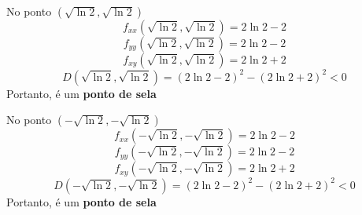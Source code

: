 \documentclass[a4paper,12pt,fleqn]{article}
\begin{document}
\begin{answer}
  \bigskip
  No ponto \(\left(\sqrt{\ln 2}, \sqrt{\ln 2}\right)\)
  \[
    f_{xx}\left(\sqrt{\ln 2}, \sqrt{\ln 2}\right)
    = 2\ln 2 -2
  \]
  \[
    f_{yy}\left(\sqrt{\ln 2}, \sqrt{\ln 2}\right)
    = 2\ln 2 -2
  \]
  \[
    f_{xy}\left(\sqrt{\ln 2}, \sqrt{\ln 2}\right)
    = 2\ln 2 +2
  \]
  \[
    D\left(\sqrt{\ln 2}, \sqrt{\ln 2}\right)
    = (2\ln 2 -2)^2 - (2\ln 2 +2)^2
    < 0
  \]
  Portanto, é um \textbf{ponto de sela}

  \bigskip
  No ponto \(\left(-\sqrt{\ln 2}, -\sqrt{\ln 2}\right)\)
  \[
    f_{xx}\left(-\sqrt{\ln 2}, -\sqrt{\ln 2}\right)
    = 2\ln 2 -2
  \]
  \[
    f_{yy}\left(-\sqrt{\ln 2}, -\sqrt{\ln 2}\right)
    = 2\ln 2 -2
  \]
  \[
    f_{xy}\left(-\sqrt{\ln 2}, -\sqrt{\ln 2}\right)
    = 2\ln 2 +2
  \]
  \[
    D\left(-\sqrt{\ln 2}, -\sqrt{\ln 2}\right)
    = (2\ln 2 -2)^2 - (2\ln 2 +2)^2
    < 0
  \]
  Portanto, é um \textbf{ponto de sela}
\end{answer}

\end{document}
